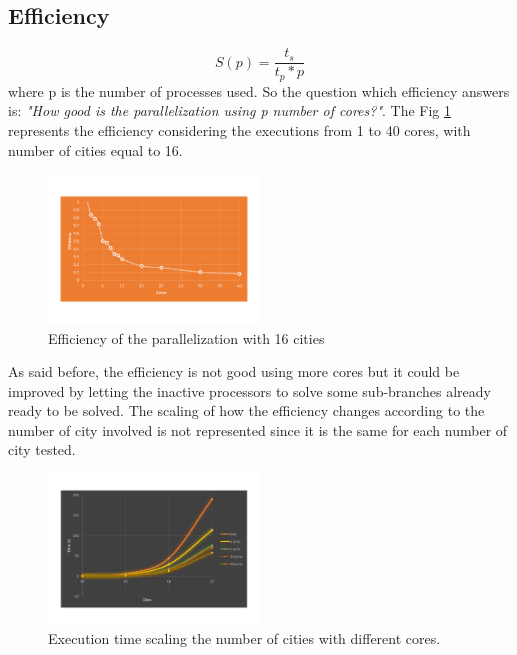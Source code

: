 \documentclass[11pt,conference]{IEEEtran}
\begin{document}
\subsection{Efficiency}
\[ S(p) = \dfrac{t_s}{t_p * p}  \]
where p is the number of processes used. So the question which efficiency answers is: \textit{"How good is the parallelization using p number of cores?"}. The Fig \ref{fig:efficiency} represents the efficiency considering the executions from 1 to 40 cores, with number of cities equal to 16.

\begin{figure}[h!]
  \centering
    \includegraphics[trim=0.0cm 3.5cm 0.0cm 3.5cm, width=0.5\textwidth]{efficiency}
    \caption{Efficiency of the parallelization with 16 cities}
    \label{fig:efficiency}
\end{figure}

As said before, the efficiency is not good using more cores but it could be improved by letting the inactive processors to solve some sub-branches already ready to be solved.
\newline
The scaling of how the efficiency changes according to the number of city involved is not represented since it is the same for each number of city tested.

\begin{figure}[h!]
  \centering
    \includegraphics[width=0.5\textwidth]{time-comparsion}
    \caption{Execution time scaling the number of cities with different cores.}
    \label{fig:time-comparsion}
\end{figure}
\end{document}
